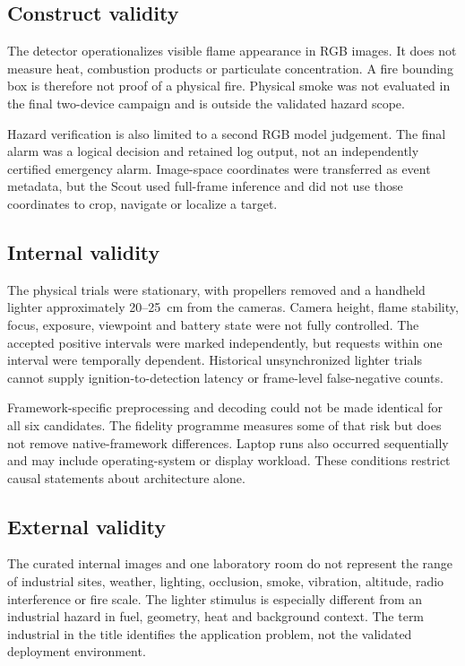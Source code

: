 \subsection{Construct validity}

The detector operationalizes visible flame appearance in RGB images. It does
not measure heat, combustion products or particulate concentration. A fire
bounding box is therefore not proof of a physical fire. Physical smoke was not
evaluated in the final two-device campaign and is outside the validated hazard
scope.

Hazard verification is also limited to a second RGB model judgement. The final
alarm was a logical decision and retained log output, not an independently
certified emergency alarm. Image-space coordinates were transferred as event
metadata, but the Scout used full-frame inference and did not use those
coordinates to crop, navigate or localize a target.

\subsection{Internal validity}

The physical trials were stationary, with propellers removed and a handheld
lighter approximately 20--25~cm from the cameras. Camera height, flame
stability, focus, exposure, viewpoint and battery state were not fully
controlled. The accepted positive intervals were marked independently, but
requests within one interval were temporally dependent. Historical
unsynchronized lighter trials cannot supply ignition-to-detection latency or
frame-level false-negative counts.

Framework-specific preprocessing and decoding could not be made identical for
all six candidates. The fidelity programme measures some of that risk but does
not remove native-framework differences. Laptop runs also occurred
sequentially and may include operating-system or display workload. These
conditions restrict causal statements about architecture alone.

\subsection{External validity}

The curated internal images and one laboratory room do not represent the
range of industrial sites, weather, lighting, occlusion, smoke, vibration,
altitude, radio interference or fire scale. The lighter stimulus is especially
different from an industrial hazard in fuel, geometry, heat and background
context. The term industrial in the title identifies the application problem,
not the validated deployment environment.

